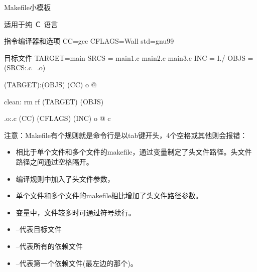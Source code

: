\documentclass[letterpaper,12pt,english]{sphinxmanual}
\begin{document}
Makefile小模板

适用于纯 Ｃ 语言

\begin{sphinxVerbatim}[commandchars=\\\{\}]
\PYGZsh{} 指令编译器和选项
CC=gcc
CFLAGS=\PYGZhy{}Wall \PYGZhy{}std=gnu99

\PYGZsh{} 目标文件
TARGET=main
SRCS = main1.c \PYGZbs{}
            main2.c  \PYGZbs{}
            main3.c
INC = \PYGZhy{}I./
OBJS = \PYGZdl{}(SRCS:.c=.o)

\PYGZdl{}(TARGET):\PYGZdl{}(OBJS)
    \PYGZdl{}(CC) \PYGZhy{}o \PYGZdl{}@ \PYGZdl{}\PYGZca{}

clean:
    rm \PYGZhy{}rf \PYGZdl{}(TARGET) \PYGZdl{}(OBJS)

\PYGZpc{}.o:\PYGZpc{}.c
    \PYGZdl{}(CC) \PYGZdl{}(CFLAGS) \PYGZdl{}(INC) \PYGZhy{}o \PYGZdl{}@ \PYGZhy{}c \PYGZdl{}\PYGZlt{}
\end{sphinxVerbatim}

\begin{DUlineblock}{0em}
\item[] 注意：Makefile有个规则就是命令行是以tab键开头，4个空格或其他则会报错：
\item[] 
\end{DUlineblock}
\begin{itemize}
\item {} 
相比于单个文件和多个文件的makefile，通过变量制定了头文件路径。头文件路径之间通过空格隔开。

\item {} 
编译规则中加入了头文件参数，

\item {} 
单个文件和多个文件的makefile相比增加了头文件路径参数。

\item {} 
变量中，文件较多时可通过符号续行。

\item {} 
 –代表目标文件

\item {} 
\sphinxcode{\sphinxupquote{\$\textasciicircum{}}} –代表所有的依赖文件

\item {} 
\sphinxcode{\sphinxupquote{\$<}} –代表第一个依赖文件(最左边的那个)。

\end{itemize}
\end{document}
